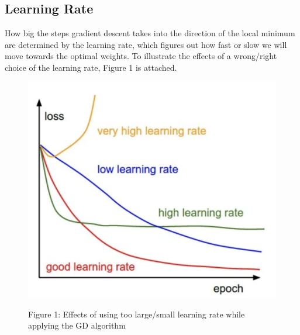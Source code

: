 \documentclass{article}
\begin{document}
\subsection{Learning Rate}
\begin{flushleft}
How big the steps gradient descent takes into the direction of the local minimum are determined by the
learning rate, which figures out how fast or slow we will move towards the optimal weights. To illustrate
the effects of a wrong/right choice of the learning rate, Figure 1 is attached.
\end{flushleft}

\begin{figure}
    \centering
    \includegraphics[width=0.5\linewidth]{Learning Rate image.png}
   

\begin{center}
    Figure 1: Effects of using too large/small learning rate while applying the GD algorithm
\end{center}
    
\end{figure}
\end{document}
